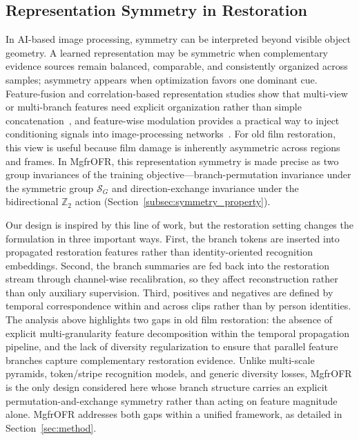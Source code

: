\subsection{Representation Symmetry in Restoration}
\label{subsec:symmetry_ai}

In AI-based image processing, symmetry can be interpreted beyond visible object geometry. A learned representation may be symmetric when complementary evidence sources remain balanced, comparable, and consistently organized across samples; asymmetry appears when optimization favors one dominant cue. Feature-fusion and correlation-based representation studies show that multi-view or multi-branch features need explicit organization rather than simple concatenation~\cite{yu2021multiview_tensor_fusion,qian2020multiview_matrix_correlation}, and feature-wise modulation provides a practical way to inject conditioning signals into image-processing networks~\cite{perez2018film}. For old film restoration, this view is useful because film damage is inherently asymmetric across regions and frames. In MgfrOFR, this representation symmetry is made precise as two group invariances of the training objective---branch-permutation invariance under the symmetric group $\mathcal{S}_G$ and direction-exchange invariance under the bidirectional $\mathbb{Z}_2$ action (Section~\ref{subsec:symmetry_property}).

Our design is inspired by this line of work, but the restoration setting changes the formulation in three important ways. First, the branch tokens are inserted into propagated restoration features rather than identity-oriented recognition embeddings. Second, the branch summaries are fed back into the restoration stream through channel-wise recalibration, so they affect reconstruction rather than only auxiliary supervision. Third, positives and negatives are defined by temporal correspondence within and across clips rather than by person identities. The analysis above highlights two gaps in old film restoration: the absence of explicit multi-granularity feature decomposition within the temporal propagation pipeline, and the lack of diversity regularization to ensure that parallel feature branches capture complementary restoration evidence. Unlike multi-scale pyramids, token/stripe recognition models, and generic diversity losses, MgfrOFR is the only design considered here whose branch structure carries an explicit permutation-and-exchange symmetry rather than acting on feature magnitude alone. MgfrOFR addresses both gaps within a unified framework, as detailed in Section~\ref{sec:method}.
